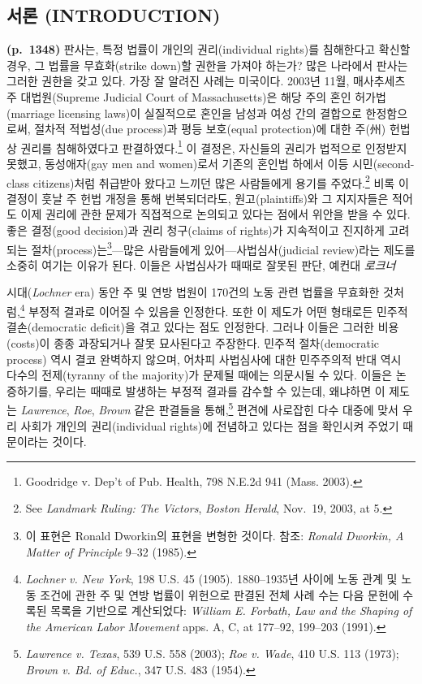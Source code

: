 \documentclass[a4paper,12pt,oneside]{article}  %
\newcommand{\emphksans}[1]{%
  {\kopubhangul\kopublatin\textsl{#1}}%
}
\begin{document}
\tableofcontents
\clearpage


\mainmatter

\subsection{서론 (INTRODUCTION)}\label{uxc11cuxb860-introduction}

\textbf{(p.~1348)} 판사는, 특정 법률이 개인의 권리(individual rights)를
침해한다고 확신할 경우, 그 법률을 무효화(strike down)할 권한을 가져야
하는가? 많은 나라에서 판사는 그러한 권한을 갖고 있다. 가장 잘 알려진
사례는 미국이다. 2003년 11월, 매사추세츠주 대법원(Supreme Judicial Court
of Massachusetts)은 해당 주의 혼인 허가법(marriage licensing laws)이
실질적으로 혼인을 남성과 여성 간의 결합으로 한정함으로써, 절차적
적법성(due process)과 평등 보호(equal protection)에 대한 주(州) 헌법상
권리를 침해하였다고 판결하였다.\footnote{Goodridge v. Dep't of Pub.
  Health, 798 N.E.2d 941 (Mass. 2003).} 이 결정은, 자신들의 권리가
법적으로 인정받지 못했고, 동성애자(gay men and women)로서 기존의 혼인법
하에서 이등 시민(second-class citizens)처럼 취급받아 왔다고 느끼던 많은
사람들에게 용기를 주었다.\footnote{See \emph{Landmark Ruling: The
  Victors}, \emph{Boston Herald}, Nov.~19, 2003, at 5.} 비록 이 결정이
훗날 주 헌법 개정을 통해 번복되더라도, 원고(plaintiffs)와 그 지지자들은
적어도 이제 권리에 관한 문제가 직접적으로 논의되고 있다는 점에서 위안을
받을 수 있다. 좋은 결정(good decision)과 권리 청구(claims of rights)가
지속적이고 진지하게 고려되는 절차(process)는\footnote{이 표현은 Ronald
  Dworkin의 표현을 변형한 것이다. 참조: \emph{Ronald Dworkin, A Matter
  of Principle} 9--32 (1985).}---많은 사람들에게
있어---사법심사(judicial review)라는 제도를 소중히 여기는 이유가 된다.
이들은 사법심사가 때때로 잘못된 판단, 예컨대 \emphksans{로크너}
시대(\emph{Lochner} era) 동안 주 및 연방 법원이 170건의 노동 관련 법률을
무효화한 것처럼,\footnote{\emph{Lochner v. New York}, 198 U.S. 45
  (1905). 1880--1935년 사이에 노동 관계 및 노동 조건에 관한 주 및 연방
  법률이 위헌으로 판결된 전체 사례 수는 다음 문헌에 수록된 목록을
  기반으로 계산되었다: \emph{William E. Forbath, Law and the Shaping of
  the American Labor Movement} apps. A, C, at 177--92, 199--203 (1991).}
부정적 결과로 이어질 수 있음을 인정한다. 또한 이 제도가 어떤 형태로든
민주적 결손(democratic deficit)을 겪고 있다는 점도 인정한다. 그러나
이들은 그러한 비용(costs)이 종종 과장되거나 잘못 묘사된다고 주장한다.
민주적 절차(democratic process) 역시 결코 완벽하지 않으며, 어차피
사법심사에 대한 민주주의적 반대 역시 다수의 전제(tyranny of the
majority)가 문제될 때에는 의문시될 수 있다. 이들은 논증하기를, 우리는
때때로 발생하는 부정적 결과를 감수할 수 있는데, 왜냐하면 이 제도는
\emph{Lawrence}, \emph{Roe}, \emph{Brown} 같은 판결들을 통해,\footnote{\emph{Lawrence v.
  Texas}, 539 U.S. 558 (2003); \emph{Roe v. Wade}, 410 U.S. 113 (1973);
  \emph{Brown v. Bd. of Educ.}, 347 U.S. 483 (1954).} 편견에 사로잡힌
다수 대중에 맞서 우리 사회가 개인의 권리(individual rights)에 전념하고
있다는 점을 확인시켜 주었기 때문이라는 것이다.
\end{document}
